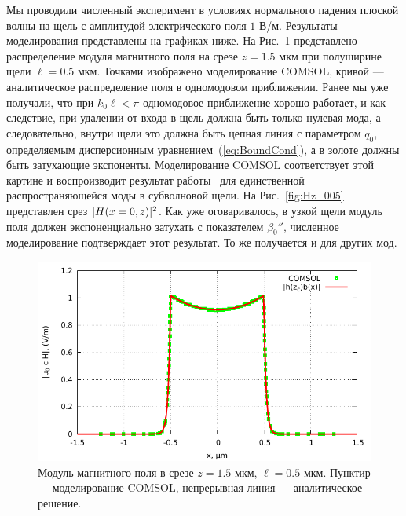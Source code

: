 Мы проводили численный эксперимент в условиях нормального падения плоской волны на щель с амплитудой электрического поля $1$ В/м.
Результаты моделирования представлены на графиках ниже. На Рис.~\ref{fig:Hz_cut_z} представлено распределение модуля магнитного поля на срезе $z = 1.5$ мкм при полуширине щели $\ell=0.5$ мкм. Точками изображено моделирование COMSOL, кривой --- аналитическое распределение поля в одномодовом приближении. Ранее мы уже получали, что при $k_0 \ell < \pi$ одномодовое приближение хорошо работает, и как следствие, при удалении от входа в щель должна быть только нулевая мода, а следовательно, внутри щели это должна быть цепная линия с параметром $q_0$, определяемым дисперсионным уравнением~(\ref{eq:BoundCond}), а в золоте должны быть затухающие экспоненты. Моделирование COMSOL соответствует этой картине  и воспроизводит результат работы~\cite{sturman2007eigenmodes} для единственной распространяющейся моды в субволновой щели. На Рис.~\ref{fig:Hz_005} представлен срез $\lvert H(x =0,z)\rvert^2$. Как уже оговаривалось, в узкой щели модуль поля должен экспоненциально затухать с показателем $\beta_0''$, численное моделирование подтверждает этот результат. То же получается и для других мод. 

\begin{figure}
    \centering
    \includegraphics[width=\textwidth]{figures/Hz_cut.pdf}
    \caption{Модуль магнитного поля в срезе $z=1.5$ мкм, $\ell = 0.5$ мкм. Пунктир --- моделирование COMSOL, непрерывная линия --- аналитическое решение. }
    \label{fig:Hz_cut_z}
\end{figure}

